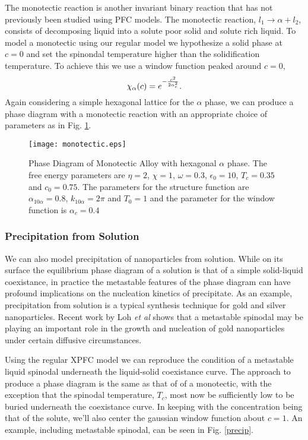 The monotectic reaction is another invariant binary reaction that has not
previously been studied using PFC models. The monotectic reaction, $l_1
\rightarrow \alpha + l_2$, consists of decomposing liquid into a solute poor
solid and solute rich liquid. To model a monotectic using our regular model we
hypothesize a solid phase at $c=0$ and set the spinondal temperature higher
than the solidification temperature. To achieve this we use a window function
peaked around $c = 0$,
%
\begin{equation}
    \chi_\alpha(c) = e^{-\frac{c^2}{2\alpha_c^2}}.
\end{equation}
%
Again considering a simple hexagonal lattice for the $\alpha$ phase, we can
produce a phase diagram with a monotectic reaction with an appropriate choice
of parameters as in Fig. \ref{monotectic}.

\begin{figure}
    \centering
	\texttt{[image: monotectic.eps]}
    \caption[Monotectic Phase Diagram]{
        \label{monotectic} Phase Diagram of Monotectic Alloy with hexagonal
        $\alpha$ phase. The free energy parameters are $\eta = 2$, $\chi=1$,
        $\omega=0.3$, $\epsilon_0 = 10$, $T_c = 0.35$ and $c_0 = 0.75$. The
        parameters for the structure function are $\alpha_{10\alpha} = 0.8$,
        $k_{10\alpha} = 2\pi$ and $T_0 = 1$ and the parameter for the window
        function is $\alpha_c = 0.4$
    }
\end{figure}

\subsubsection{Precipitation from Solution} %

We can also model precipitation of nanoparticles from solution. While on its
surface the equilibrium phase diagram of a solution is that of a simple
solid-liquid coexistance, in practice the metastable features of the phase
diagram can have profound implications on the nucleation kinetics of
precipitate. As an example, precipitation from solution is a typical synthesis
technique for gold and silver nanoparticles. Recent work by Loh \textit{et al}
shows that a metastable spinodal may be playing an important role in the growth
and nucleation of gold nanoparticles under certain diffusive circumstances.

Using the regular XPFC model we can reproduce the condition of a metastable
liquid spinodal underneath the liquid-solid coexistance curve. The approach to
produce a phase diagram is the same as that of of a monotectic, with the
exception that the spinodal temperature, $T_c$, most now be sufficiently low to
be buried underneath the coexistance curve. In keeping with the concentration
being that of the solute, we'll also center the gaussian window function about
$c = 1$. An example, including metastable spinodal, can be seen in Fig.
\ref{precip}.

